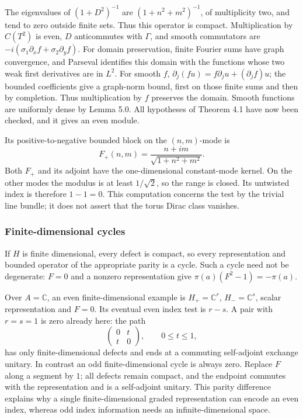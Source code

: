 \documentclass[
  11pt,
]{article}
\begin{document}
The eigenvalues of \((1+D^2)^{-1}\) are \((1+n^2+m^2)^{-1}\), of
multiplicity two, and tend to zero outside finite sets. Thus this
operator is compact. Multiplication by \(C(T^2)\) is even, \(D\)
anticommutes with \(\Gamma\), and smooth commutators are
\(-i(\sigma_1\partial_x f+\sigma_2\partial_y f)\). For domain
preservation, finite Fourier sums have graph convergence, and Parseval
identifies this domain with the functions whose two weak first
derivatives are in \(L^2\). For smooth \(f\),
\(\partial_j(fu)=f\partial_ju+(\partial_jf)u\); the bounded coefficients
give a graph-norm bound, first on those finite sums and then by
completion. Thus multiplication by \(f\) preserves the domain. Smooth
functions are uniformly dense by Lemma 5.0. All hypotheses of Theorem
4.1 have now been checked, and it gives an even module.

Its positive-to-negative bounded block on the \((n,m)\)-mode is \[
F_+(n,m)=\frac{n+im}{\sqrt{1+n^2+m^2}}.
\tag{5.4}
\] Both \(F_+\) and its adjoint have the one-dimensional constant-mode
kernel. On the other modes the modulus is at least \(1/\sqrt2\), so the
range is closed. Its untwisted index is therefore \(1-1=0\). This
computation concerns the test by the trivial line bundle; it does not
assert that the torus Dirac class vanishes.

\subsubsection{Finite-dimensional
cycles}\label{finite-dimensional-cycles}

If \(H\) is finite dimensional, every defect is compact, so every
representation and bounded operator of the appropriate parity is a
cycle. Such a cycle need not be degenerate: \(F=0\) and a nonzero
representation give \(\pi(a)(F^2-1)=-\pi(a)\).

Over \(A=\mathbb C\), an even finite-dimensional example is
\(H_+=\mathbb C^r\), \(H_-=\mathbb C^s\), scalar representation and
\(F=0\). Its eventual even index test is \(r-s\). A pair with \(r=s=1\)
is zero already here: the path \[
\begin{pmatrix}0&t\\t&0\end{pmatrix},
\qquad0\leq t\leq1,
\] has only finite-dimensional defects and ends at a commuting
self-adjoint exchange unitary. In contrast an odd finite-dimensional
cycle is always zero. Replace \(F\) along a segment by \(1\); all
defects remain compact, and the endpoint commutes with the
representation and is a self-adjoint unitary. This parity difference
explains why a single finite-dimensional graded representation can
encode an even index, whereas odd index information needs an
infinite-dimensional space.
\end{document}
